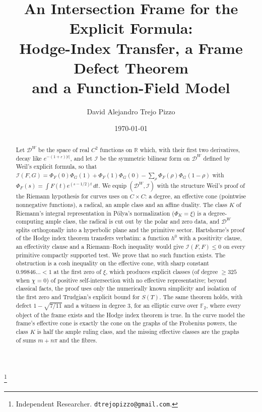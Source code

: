 \documentclass[11pt]{amsart}
\theoremstyle{definition}
\theoremstyle{remark}
\newcommand{\R}{\mathbb R}
\newcommand{\F}{\mathbb F}
\newcommand{\DW}{\mathcal D^{W}}
\newcommand{\I}{\mathcal I}
\begin{document}
\title[An intersection frame for the explicit formula]
{An Intersection Frame for the Explicit Formula:\\
Hodge-Index Transfer, a Frame Defect Theorem\\
and a Function-Field Model}

\author{David Alejandro Trejo Pizzo}
\thanks{Independent Researcher. \texttt{dtrejopizzo@gmail.com}.}

\date{\today}

\begin{abstract}
Let $\DW$ be the space of real $C^2$ functions on $\R$ which, with their first two derivatives, decay
like $e^{-(1+\varepsilon)|t|}$, and let $\I$ be the symmetric bilinear form on $\DW$ defined by
Weil's explicit formula, so that $\I(F,G)=\Phi_F(0)\Phi_G(1)+\Phi_F(1)\Phi_G(0)-\sum_\rho\Phi_F(\rho)\Phi_G(1-\rho)$
with $\Phi_F(s)=\int F(t)e^{(s-1/2)t}\,dt$. We equip $(\DW,\I)$ with the structure Weil's proof of the
Riemann hypothesis for curves uses on $C\times C$: a degree, an effective cone (pointwise nonnegative
functions), a radical, an ample class and an affine duality. The class $K$ of Riemann's integral
representation in P\'olya's normalization ($\Phi_K=\xi$) is a degree-computing ample class, the
radical is cut out by the polar and zero data, and $\DW$ splits orthogonally into a hyperbolic plane
and the primitive sector. Hartshorne's proof of the Hodge index theorem transfers verbatim:
a function $h^0$ with a positivity clause, an effectivity clause and a Riemann--Roch inequality would
give $\I(F,F)\le0$ on every primitive compactly supported test. We prove that no such function exists.
The obstruction is a cosh inequality on the effective cone, with sharp constant
$0.99846\ldots<1$ at the first zero of $\xi$, which produces explicit classes (of degree $\ge325$ when $\chi=0$) of positive self-intersection with
no effective representative; beyond classical facts, the proof uses only the numerically known
simplicity and isolation of the first zero and Trudgian's explicit bound for $S(T)$. The same theorem holds, with defect $1-\sqrt{7/11}$ and a
witness in degree $3$, for an elliptic curve over $\F_2$, where every object of the frame exists and
the Hodge index theorem is true. In the curve model the frame's effective cone is exactly the cone
on the graphs of the Frobenius powers, the class $K$ is half the ample ruling class, and the missing
effective classes are the graphs of sums $m+n\pi$ and the fibres.
\end{abstract}

\maketitle
\tableofcontents
\end{document}
